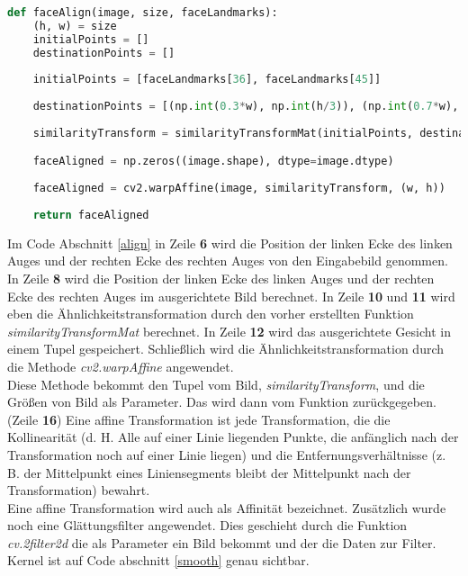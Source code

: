 \begin{lstlisting}[caption=Gesichtsausrichtung,label=align,language=python]
def faceAlign(image, size, faceLandmarks):
	(h, w) = size
	initialPoints = []
	destinationPoints = []
	
	initialPoints = [faceLandmarks[36], faceLandmarks[45]]
	
	destinationPoints = [(np.int(0.3*w), np.int(h/3)), (np.int(0.7*w), np.int(h/3))]
	
	similarityTransform = similarityTransformMat(initialPoints, destinationPoints)

	faceAligned = np.zeros((image.shape), dtype=image.dtype)
	
	faceAligned = cv2.warpAffine(image, similarityTransform, (w, h))
	
	return faceAligned

\end{lstlisting}
\justify
Im Code Abschnitt \ref{align} in Zeile \textbf{6} wird die Position der linken Ecke des linken Auges und der rechten Ecke des rechten Auges von den Eingabebild genommen. 
In Zeile \textbf{8} wird die Position der linken Ecke des linken Auges und der rechten Ecke des rechten Auges im ausgerichtete Bild berechnet. 
\justify 
In Zeile \textbf{10} und \textbf{11} wird eben die Ähnlichkeitstransformation durch den vorher erstellten Funktion \textit{similarityTransformMat} berechnet.
\justify 
In Zeile \textbf{12} wird das ausgerichtete Gesicht in einem Tupel gespeichert.
\justify
Schließlich wird die Ähnlichkeitstransformation durch die Methode \textit{cv2.warpAffine} angewendet.\\
Diese Methode bekommt den Tupel vom Bild, \textit{similarityTransform}, und die Größen von Bild als Parameter. Das wird dann vom Funktion zurückgegeben. (Zeile \textbf{16}) 
\justify
Eine affine Transformation ist jede Transformation, die die Kollinearität (d. H. Alle auf einer Linie liegenden Punkte, die anfänglich nach der Transformation noch auf einer Linie liegen) und die Entfernungsverhältnisse (z. B. der Mittelpunkt eines Liniensegments bleibt der Mittelpunkt nach der Transformation) bewahrt. \\
Eine affine Transformation wird auch als Affinität bezeichnet.\cite{affine}
\justify 
Zusätzlich wurde noch eine Glättungsfilter angewendet. Dies geschieht durch die Funktion \textit{cv.2filter2d} die als Parameter ein Bild bekommt und der die Daten zur Filter. \\
Kernel ist auf Code abschnitt \ref{smooth} genau sichtbar. 

